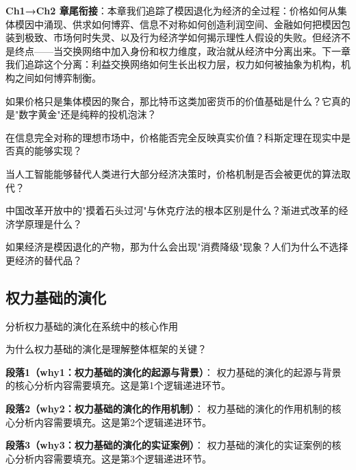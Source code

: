 \documentclass[../main.tex]{subfiles}
\begin{document}
	\textbf{Ch1→Ch2 章尾衔接}：本章我们追踪了模因退化为经济的全过程：价格如何从集体模因中涌现、供求如何博弈、信息不对称如何创造利润空间、金融如何把模因包装到极致、市场何时失灵、以及行为经济学如何揭示理性人假设的失败。但经济不是终点——当交换网络中加入身份和权力维度，政治就从经济中分离出来。下一章我们追踪这个分离：利益交换网络如何生长出权力层，权力如何被抽象为机构，机构之间如何博弈制衡。

	\begin{reader_anticipation}
		\item 如果价格只是集体模因的聚合，那比特币这类加密货币的价值基础是什么？它真的是"数字黄金"还是纯粹的投机泡沫？
		\item 在信息完全对称的理想市场中，价格能否完全反映真实价值？科斯定理在现实中是否真的能够实现？
		\item 当人工智能能够替代人类进行大部分经济决策时，价格机制是否会被更优的算法取代？
		\item 中国改革开放中的"摸着石头过河"与休克疗法的根本区别是什么？渐进式改革的经济学原理是什么？
		\item 如果经济是模因退化的产物，那为什么会出现"消费降级"现象？人们为什么不选择更经济的替代品？
	\end{reader_anticipation}



\subsection{权力基础的演化}

\begin{motivation}
分析权力基础的演化在系统中的核心作用
\end{motivation}

\begin{logicmap}
[逻辑链占位]
\end{logicmap}

\begin{questionbox}
为什么权力基础的演化是理解整体框架的关键？
\end{questionbox}

\textbf{段落1（why1：权力基础的演化的起源与背景）}：
权力基础的演化的起源与背景的核心分析内容需要填充。这是第1个逻辑递进环节。


\textbf{段落2（why2：权力基础的演化的作用机制）}：
权力基础的演化的作用机制的核心分析内容需要填充。这是第2个逻辑递进环节。


\textbf{段落3（why3：权力基础的演化的实证案例）}：
权力基础的演化的实证案例的核心分析内容需要填充。这是第3个逻辑递进环节。
\end{document}
